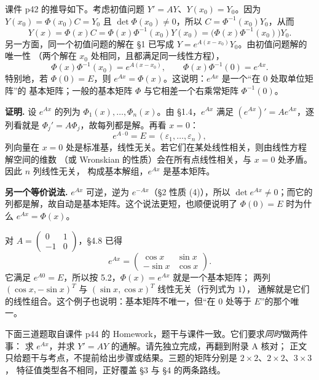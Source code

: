\documentclass[11pt]{ctexart}
\newcommand{\pmat}[1]{\begin{pmatrix}#1\end{pmatrix}}
\begin{document}
课件 p42 的推导如下。考虑初值问题 $Y'=AY$、$Y(x_0)=Y_0$。因为
$Y(x_0)=\Phi(x_0)C=Y_0$ 且 $\det\Phi(x_0)\ne0$，所以 $C=\Phi^{-1}(x_0)Y_0$，从而
\[
Y(x)=\Phi(x)C=\Phi(x)\Phi^{-1}(x_0)Y(x_0)
=\bigl(\Phi(x)\Phi^{-1}(x_0)\bigr)Y_0 .
\]
另一方面，同一个初值问题的解在 §1 已写成 $Y=e^{A(x-x_0)}Y_0$。由初值问题解的唯一性
（两个解在 $x_0$ 处相同，且都满足同一线性方程），
\begin{equation}\label{eq:PhiExp}
\Phi(x)\Phi^{-1}(x_0)=e^{A(x-x_0)},\qquad
\Phi(x)\Phi^{-1}(0)=e^{Ax}.
\end{equation}
特别地，若 $\Phi(0)=E$，则 $e^{Ax}=\Phi(x)$。这说明：$e^{Ax}$ 是一个“在 $0$ 处取单位矩阵”的
基本矩阵；一般的基本矩阵 $\Phi$ 与它相差一个右乘常矩阵 $\Phi^{-1}(0)$。



\textbf{证明.} 设 $e^{Ax}$ 的列为 $\Phi_1(x),\dots,\Phi_n(x)$。由 §1.4，$e^{Ax}$ 满足
$(e^{Ax})'=Ae^{Ax}$，逐列看就是 $\Phi_j'=A\Phi_j$，故每列都是解。再看 $x=0$：
\[
e^{A\cdot0}=E=(\varepsilon_1,\dots,\varepsilon_n),
\]
列向量在 $x=0$ 处是标准基，线性无关。若它们在某处线性相关，则由线性方程解空间的维数
（或 Wronskian 的性质）会在所有点线性相关，与 $x=0$ 处矛盾。因此 $n$ 列线性无关，
构成基本解组，$e^{Ax}$ 是基本矩阵。

\textbf{另一个等价说法.} $e^{Ax}$ 可逆，逆为 $e^{-Ax}$（§2 性质 (4)），所以
$\det e^{Ax}\ne0$；而它的列都是解，故自动是基本矩阵。这个说法更短，也顺便说明了
$\Phi(0)=E$ 时为什么 $e^{Ax}=\Phi(x)$。


对 $A=\pmat{0&1\\-1&0}$，§4.8 已得
\[
e^{Ax}=\pmat{\cos x&\sin x\\-\sin x&\cos x}.
\]
它满足 $e^{A0}=E$，所以按 5.2，$\Phi(x)=e^{Ax}$ 就是一个基本矩阵；
两列 $(\cos x,-\sin x)^T$ 与 $(\sin x,\cos x)^T$ 线性无关（行列式为 $1$），
通解就是它们的线性组合。这个例子也说明：基本矩阵不唯一，但“在 $0$ 处等于 $E$”的那个唯一。

\flowerrule

\clearpage
{}

下面三道题取自课件 p44 的 Homework，题干与课件一致。它们要求\emph{同时}做两件事：
求 $e^{Ax}$，并求 $Y'=AY$ 的通解。请先独立完成，再翻到附录 A 核对；
正文只给题干与考点，不提前给出步骤或结果。三题的矩阵分别是 $2\times2$、$2\times2$、$3\times3$，
特征值类型各不相同，正好覆盖 §3 与 §4 的两条路线。
\end{document}
